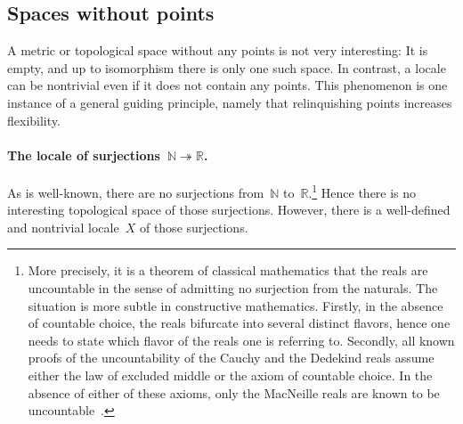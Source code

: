 \documentclass{ws-rv9x6}
\newcommand{\NN}{\mathbb{N}}
\newcommand{\RR}{\mathbb{R}}
\renewcommand{\_}{\mathpunct{.}}
\newcommand{\?}{\,{:}\,}
\begin{document}
\subsection{Spaces without points}
\label{sect:examples-no-points}

A metric or topological space without any points is not very interesting: It is
empty, and up to isomorphism there is only one such space. In contrast, a
locale can be nontrivial even if it does not contain any points. This
phenomenon is one instance of a general guiding principle, namely that relinquishing
points increases flexibility.

\paragraph{The locale of surjections~$\NN \twoheadrightarrow \RR$.} As is
well-known, there are no surjections from~$\NN$ to~$\RR$.\footnote{More
precisely, it is a theorem of classical mathematics that the reals are
uncountable in the sense of admitting no surjection from the naturals. The
situation is more subtle in constructive mathematics. Firstly, in the absence
of countable choice, the reals bifurcate into several distinct flavors, hence
one needs to state which flavor of the reals one is referring to. Secondly, all
known proofs of the uncountability of the Cauchy and the Dedekind reals assume
either the law of excluded middle or the axiom of countable choice. In the
absence of either of these axioms, only the MacNeille reals are known to be
uncountable~\cite{blechschmidt-hutzler:macneille}.} Hence there is no
interesting topological space of those surjections. However, there is a
well-defined and nontrivial locale~$X$ of those surjections.
\end{document}
